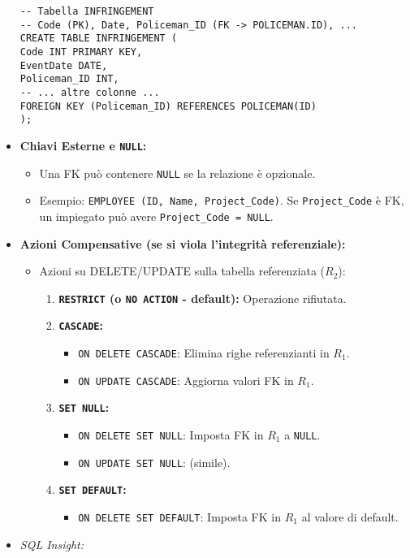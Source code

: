 \begin{itemize}
\begin{verbatim}
-- Tabella INFRINGEMENT
-- Code (PK), Date, Policeman_ID (FK -> POLICEMAN.ID), ...
CREATE TABLE INFRINGEMENT (
Code INT PRIMARY KEY,
EventDate DATE,
Policeman_ID INT,
-- ... altre colonne ...
FOREIGN KEY (Policeman_ID) REFERENCES POLICEMAN(ID)
);
		\end{verbatim}
		\item \textbf{Chiavi Esterne e \texttt{NULL}:}
		\begin{itemize}
			\item Una FK può contenere \texttt{NULL} se la relazione è opzionale.
			\item Esempio: \texttt{EMPLOYEE (ID, Name, Project\_Code)}. Se \texttt{Project\_Code} è FK, un impiegato può avere \texttt{Project\_Code = NULL}.
		\end{itemize}
		\item \textbf{Azioni Compensative (se si viola l'integrità referenziale):}
		\begin{itemize}
			\item Azioni su DELETE/UPDATE sulla tabella referenziata ($R_2$):
			\begin{enumerate}
				\item \textbf{\texttt{RESTRICT} (o \texttt{NO ACTION} - default):} Operazione rifiutata.
				\item \textbf{\texttt{CASCADE}:}
				\begin{itemize}
					\item \texttt{ON DELETE CASCADE}: Elimina righe referenzianti in $R_1$.
					\item \texttt{ON UPDATE CASCADE}: Aggiorna valori FK in $R_1$.
				\end{itemize}
				\item \textbf{\texttt{SET NULL}:}
				\begin{itemize}
					\item \texttt{ON DELETE SET NULL}: Imposta FK in $R_1$ a \texttt{NULL}.
					\item \texttt{ON UPDATE SET NULL}: (simile).
				\end{itemize}
				\item \textbf{\texttt{SET DEFAULT}:}
				\begin{itemize}
					\item \texttt{ON DELETE SET DEFAULT}: Imposta FK in $R_1$ al valore di default.
				\end{itemize}
			\end{enumerate}
		\end{itemize}
		\item \textit{SQL Insight:}

\end{itemize}

